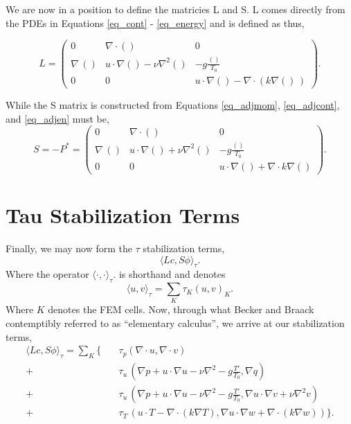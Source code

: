 We are now in a position to define the matricies L and S. L comes
directly from the PDEs in Equations \ref{eq_cont} - \ref{eq_energy} and is
defined as thus, 

\begin{equation}
\renewcommand\arraystretch{2}
 L = 
  \begin{pmatrix}
    0 & \nabla \cdot () & 0   \\
    \nabla \,() & u \cdot \nabla() - \nu \nabla^2() & -g \frac{()}{T_0}  \\
    0 & 0 & u \cdot \nabla() - \nabla \cdot (k \nabla() \,)
  \end{pmatrix}.
\end{equation}

While the S matrix is constructed from Equations
\ref{eq_adjmom}, \ref{eq_adjcont}, and \ref{eq_adjen} must be, 
\begin{equation}
\renewcommand\arraystretch{2}
 S = -P^* = 
  \begin{pmatrix}
    0 & \nabla \cdot () & 0   \\
    \nabla \,() & u \cdot \nabla() + \nu \nabla^2() &  -g \frac{()}{T_0}  \\
    0 & 0 & u \cdot \nabla() + \nabla \cdot k \nabla()
  \end{pmatrix}.
\end{equation}

%
%
\section{Tau Stabilization Terms}

Finally, we may now form the $\tau$ stabilization terms, 
\begin{equation}
 \langle Lc,S\phi \rangle_\tau. 
\end{equation}
Where the operator $ \langle \cdot,\cdot \rangle_\tau. $ is shorthand 
and denotes
\begin{equation}
 \langle u,v \rangle_\tau = \sum_K \tau_K (u,v)_K.
\end{equation}
Where $K$ denotes the FEM cells. Now, through what Becker and Braack
contemptibly referred to as ``elementary calculus'', we arrive at our
stabilization terms,  
\begin{align*}
 \langle Lc,S\phi \rangle_\tau = \sum_K \{ \quad &\tau_p (\nabla \cdot u,
 \nabla \cdot v) \\
 +\quad &\tau_u \,(\nabla p + u \cdot \nabla u - \nu \nabla^2 - g \frac{T'}{T_0},
 \nabla q) \\
 +\quad &\tau_u \, (\nabla p + u \cdot \nabla u - \nu \nabla^2 - g \frac{T'}{T_0},
 \nabla u \cdot \nabla v + \nu \nabla^2 v) \\
 +\quad &\tau_T \, (u \cdot T - \nabla \cdot (k \nabla T), \nabla u \cdot \nabla
 w + \nabla \cdot (k \nabla w)) \}.
\end{align*}

